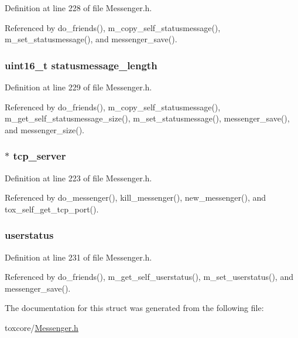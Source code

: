 Definition at line 228 of file Messenger.\+h.



Referenced by do\+\_\+friends(), m\+\_\+copy\+\_\+self\+\_\+statusmessage(), m\+\_\+set\+\_\+statusmessage(), and messenger\+\_\+save().

\hypertarget{struct_messenger_a43fe9dde52dc12e90933150eca91c0c3}{
\subsubsection[{statusmessage\+\_\+length}]{\setlength{\rightskip}{0pt plus 5cm}uint16\+\_\+t statusmessage\+\_\+length}}\label{struct_messenger_a43fe9dde52dc12e90933150eca91c0c3}


Definition at line 229 of file Messenger.\+h.



Referenced by do\+\_\+friends(), m\+\_\+copy\+\_\+self\+\_\+statusmessage(), m\+\_\+get\+\_\+self\+\_\+statusmessage\+\_\+size(), m\+\_\+set\+\_\+statusmessage(), messenger\+\_\+save(), and messenger\+\_\+size().

\hypertarget{struct_messenger_afc53e878009e340983270593e62cadef}{
\subsubsection[{tcp\+\_\+server}]{$\ast$ tcp\+\_\+server}}\label{struct_messenger_afc53e878009e340983270593e62cadef}


Definition at line 223 of file Messenger.\+h.



Referenced by do\+\_\+messenger(), kill\+\_\+messenger(), new\+\_\+messenger(), and tox\+\_\+self\+\_\+get\+\_\+tcp\+\_\+port().

\hypertarget{struct_messenger_adde524f5a15465585cbc2543cd0b2710}{
\subsubsection[{userstatus}]{ userstatus}}\label{struct_messenger_adde524f5a15465585cbc2543cd0b2710}


Definition at line 231 of file Messenger.\+h.



Referenced by do\+\_\+friends(), m\+\_\+get\+\_\+self\+\_\+userstatus(), m\+\_\+set\+\_\+userstatus(), and messenger\+\_\+save().



The documentation for this struct was generated from the following file\+:\begin{DoxyCompactItemize}
\item 
toxcore/\hyperlink{_messenger_8h}{Messenger.\+h}\end{DoxyCompactItemize}
